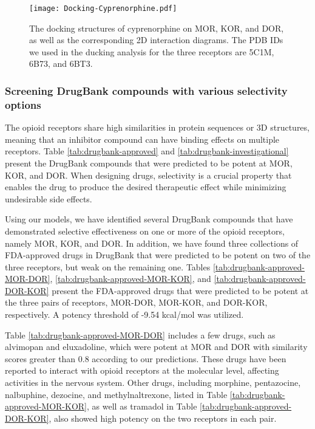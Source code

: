 \documentclass[10pt]{article}
\begin{document}
		\begin{figure}[ht]
			\centering
			\texttt{[image: Docking-Cyprenorphine.pdf]} 
			\caption{{\footnotesize The docking structures of cyprenorphine on MOR, KOR, and DOR, as well as the corresponding 2D interaction diagrams. The PDB IDs we used in the ducking analysis for the three receptors are 5C1M, 6B73, and 6BT3.} }
			\label{Fig:Docking-Cyprenorphine}
		\end{figure} 
		
		
		\subsubsection{Screening DrugBank  compounds with various selectivity options}
		
		The opioid receptors share high similarities in protein sequences or 3D structures, meaning that an inhibitor compound can have binding effects on multiple receptors. Table \ref{tab:drugbank-approved} and \ref{tab:drugbank-investigational} present the DrugBank compounds that were predicted to be potent at MOR, KOR, and DOR. When designing drugs, selectivity is a crucial property that enables the drug to produce the desired therapeutic effect while minimizing undesirable side effects.
		
		Using our models, we have identified several DrugBank compounds that have demonstrated selective effectiveness on one or more of the opioid receptors, namely MOR, KOR, and DOR. In addition, we have found three collections of FDA-approved drugs in DrugBank that were predicted to be potent on two of the three receptors, but weak on the remaining one. Tables \ref{tab:drugbank-approved-MOR-DOR}, \ref{tab:drugbank-approved-MOR-KOR}, and \ref{tab:drugbank-approved-DOR-KOR} present the FDA-approved drugs that were predicted to be potent at the three pairs of receptors, MOR-DOR, MOR-KOR, and DOR-KOR, respectively. A potency threshold of -9.54 kcal/mol was utilized.
		
		Table \ref{tab:drugbank-approved-MOR-DOR} includes a few drugs, such as alvimopan and eluxadoline, which were potent at MOR and DOR with similarity scores greater than 0.8 according to our predictions. These drugs have been reported to interact with opioid receptors at the molecular level, affecting activities in the nervous system. Other drugs, including morphine, pentazocine, nalbuphine, dezocine, and methylnaltrexone, listed in Table \ref{tab:drugbank-approved-MOR-KOR}, as well as tramadol in Table \ref{tab:drugbank-approved-DOR-KOR}, also showed high potency on the two receptors in each pair.
		
\end{document}
